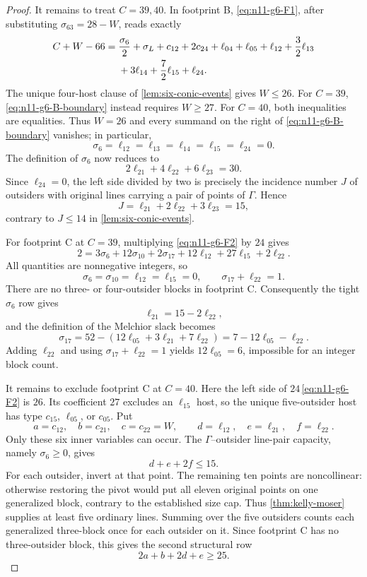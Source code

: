 \begin{proof}
It remains to treat $C=39,40$.  In footprint B,
\eqref{eq:n11-g6-F1}, after substituting
$\sigma_{63}=28-W$, reads exactly
\begin{align}
C+W-66={}&\frac{\sigma_6}{2}+\sigma_L+c_{12}+2c_{24}
 +\ell_{04}+\ell_{05}+\ell_{12}+\frac32\ell_{13}\notag\\
&+3\ell_{14}+\frac72\ell_{15}+\ell_{24}.
\label{eq:n11-g6-B-boundary}
\end{align}
The unique four-host clause of \cref{lem:six-conic-events} gives $W\le26$.
For $C=39$, \eqref{eq:n11-g6-B-boundary} instead requires $W\ge27$.
For $C=40$, both inequalities are equalities.  Thus $W=26$ and every
summand on the right of \eqref{eq:n11-g6-B-boundary} vanishes; in particular,
\[
 \sigma_6=\ell_{12}=\ell_{13}=\ell_{14}=\ell_{15}=\ell_{24}=0.
\]
The definition of $\sigma_6$ now reduces to
\[
 2\ell_{21}+4\ell_{22}+6\ell_{23}=30.
\]
Since $\ell_{24}=0$, the left side divided by two is precisely the incidence
number $J$ of outsiders with original lines carrying a pair of points of
$\Gamma$.  Hence
\[
 J=\ell_{21}+2\ell_{22}+3\ell_{23}=15,
\]
contrary to $J\le14$ in \cref{lem:six-conic-events}.

For footprint C at $C=39$, multiplying \eqref{eq:n11-g6-F2} by $24$ gives
\[
2=3\sigma_6+12\sigma_{10}+2\sigma_{17}
+12\ell_{12}+27\ell_{15}+2\ell_{22}.
\]
All quantities are nonnegative integers, so
\[
 \sigma_6=\sigma_{10}=\ell_{12}=\ell_{15}=0,
 \qquad \sigma_{17}+\ell_{22}=1.
\]
There are no three- or four-outsider blocks in footprint C.  Consequently
the tight $\sigma_6$ row gives
\[
 \ell_{21}=15-2\ell_{22},
\]
and the definition of the Melchior slack becomes
\[
 \sigma_{17}=52-(12\ell_{05}+3\ell_{21}+7\ell_{22})
              =7-12\ell_{05}-\ell_{22}.
\]
Adding $\ell_{22}$ and using $\sigma_{17}+\ell_{22}=1$ yields
$12\ell_{05}=6$, impossible for an integer block count.

It remains to exclude footprint C at $C=40$.  Here the left side of
$24\,$\eqref{eq:n11-g6-F2} is $26$.  Its coefficient $27$ excludes an
$\ell_{15}$ host, so the unique five-outsider host has type
$c_{15}$, $\ell_{05}$, or $c_{05}$.  Put
\[
 a=c_{12},\quad b=c_{21},\quad c=c_{22}=W,
 \qquad d=\ell_{12},\quad e=\ell_{21},\quad f=\ell_{22}.
\]
Only these six inner variables can occur.  The $\Gamma$--outsider line-pair
capacity, namely $\sigma_6\ge0$, gives
\begin{equation}
 d+e+2f\le15.\label{eq:n11-g6-row6}
\end{equation}
For each outsider, invert at that point.  The remaining ten points are
noncollinear: otherwise restoring the pivot would put all eleven original
points on one generalized block, contrary to the established size cap.
Thus \cref{thm:kelly-moser} supplies at least five ordinary
lines.  Summing over the five outsiders counts each generalized three-block
once for each outsider on it.  Since footprint C has no three-outsider
block, this gives the second structural row
\begin{equation}
 2a+b+2d+e\ge25.\label{eq:n11-g6-row26}
\end{equation}


\end{proof}

